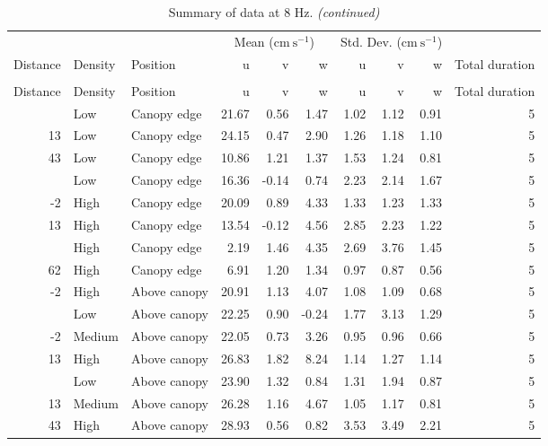 \documentclass[10pt,]{article}
\begin{document}
\clearpage
\begingroup\fontsize{7}{9}\selectfont

\begin{longtable}{rllrrrrrrr}
\caption{\label{tab:unnamed-chunk-2}Summary of data at 8 Hz.}\\
\toprule
\multicolumn{3}{c}{ } & \multicolumn{3}{c}{Mean ($\text{cm}~\text{s}^{-1}$)} & \multicolumn{3}{c}{Std. Dev. ($\text{cm}~\text{s}^{-1}$)} \\
\cmidrule(l{2pt}r{2pt}){4-6} \cmidrule(l{2pt}r{2pt}){7-9}
Distance & Density & Position & u & v & w & u & v & w & Total duration\\
\midrule
\endfirsthead
\caption[]{\label{tab:unnamed-chunk-2}Summary of data at 8 Hz. \textit{(continued)}}\\
\toprule
Distance & Density & Position & u & v & w & u & v & w & Total duration\\
\midrule
\endhead
\
\endfoot
\bottomrule
\endlastfoot
-2 & Low & Canopy edge & 21.67 & 0.56 & 1.47 & 1.02 & 1.12 & 0.91 & 5\\
13 & Low & Canopy edge & 24.15 & 0.47 & 2.90 & 1.26 & 1.18 & 1.10 & 5\\
43 & Low & Canopy edge & 10.86 & 1.21 & 1.37 & 1.53 & 1.24 & 0.81 & 5\\
\addlinespace
62 & Low & Canopy edge & 16.36 & -0.14 & 0.74 & 2.23 & 2.14 & 1.67 & 5\\
-2 & High & Canopy edge & 20.09 & 0.89 & 4.33 & 1.33 & 1.23 & 1.33 & 5\\
13 & High & Canopy edge & 13.54 & -0.12 & 4.56 & 2.85 & 2.23 & 1.22 & 5\\
\addlinespace
43 & High & Canopy edge & 2.19 & 1.46 & 4.35 & 2.69 & 3.76 & 1.45 & 5\\
62 & High & Canopy edge & 6.91 & 1.20 & 1.34 & 0.97 & 0.87 & 0.56 & 5\\
-2 & High & Above canopy & 20.91 & 1.13 & 4.07 & 1.08 & 1.09 & 0.68 & 5\\
\addlinespace
-2 & Low & Above canopy & 22.25 & 0.90 & -0.24 & 1.77 & 3.13 & 1.29 & 5\\
-2 & Medium & Above canopy & 22.05 & 0.73 & 3.26 & 0.95 & 0.96 & 0.66 & 5\\
13 & High & Above canopy & 26.83 & 1.82 & 8.24 & 1.14 & 1.27 & 1.14 & 5\\
\addlinespace
13 & Low & Above canopy & 23.90 & 1.32 & 0.84 & 1.31 & 1.94 & 0.87 & 5\\
13 & Medium & Above canopy & 26.28 & 1.16 & 4.67 & 1.05 & 1.17 & 0.81 & 5\\
43 & High & Above canopy & 28.93 & 0.56 & 0.82 & 3.53 & 3.49 & 2.21 & 5\\

\end{longtable}
\end{document}
